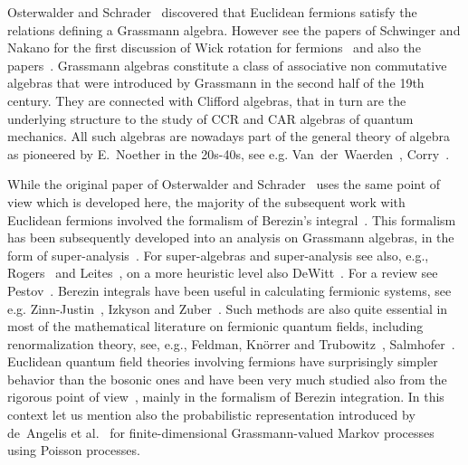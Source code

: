 \documentclass{article}
\begin{document}
Osterwalder and
Schrader~{\cite{osterwalder_euclidean_1973,osterwalder_euclidean_1973-2}}
discovered that Euclidean fermions satisfy the relations defining a Grassmann
algebra. However see the papers of Schwinger and Nakano for the first
discussion of Wick rotation for
fermions~{\cite{schwinger_euclidean_1958,schwinger_euclidean_1959}} and also
the
papers~{\cite{van_nieuwenhuizen_euclidean_1996,williams_euclidean_1974,MR0452281,lehmann_probabilistic_1991,borasi}}.
Grassmann algebras constitute a class of associative non commutative algebras
that were introduced by Grassmann in the second half of the 19th century. They
are connected with Clifford algebras, that in turn are the underlying
structure to the study of CCR and CAR algebras of quantum mechanics. All such
algebras are nowadays part of the general theory of algebra as pioneered by
E.~Noether in the 20s-40s, see e.g.
Van~der~Waerden~{\cite{van2003algebra1,van2003algebra2}},
Corry~{\cite{corry_modern_2004}}.

While the original paper of Osterwalder and
Schrader~{\cite{osterwalder_euclidean_1973-2}} uses the same point of view
which is developed here, the majority of the subsequent work with Euclidean
fermions involved the formalism of Berezin's integral~{\cite{Berezin2}}. This
formalism has been subsequently developed into an analysis on Grassmann
algebras, in the form of super-analysis~{\cite{Berezin2}}. For super-algebras
and super-analysis see also, e.g., Rogers~{\cite{Rogers2007}} and
Leites~{\cite{Leites}}, on a more heuristic level also DeWitt~{\cite{DeWitt}}.
For a review see Pestov~{\cite{pestov_analysis_1994}}. Berezin integrals have
been useful in calculating fermionic systems, see e.g.
Zinn-Justin~{\cite{ZinnJustin}}, Izkyson and Zuber~{\cite{Itzykson}}. Such
methods are also quite essential in most of the mathematical literature on
fermionic quantum fields, including renormalization theory, see, e.g.,
Feldman, Kn{\"o}rrer and Trubowitz~{\cite{MR1905424}},
Salmhofer~{\cite{salmhofer_renormalization}}. Euclidean quantum field theories
involving fermions have surprisingly simpler behavior than the bosonic ones
and have been very much studied also from the rigorous point of
view~{\cite{gawedzki_gross_neveu_1985,feldman_renormalizable_1986,lesniewski_effective_1987,rivasseau_perturbative_1991,disertori_continuous_1998,benfatto_functional_2007,mastropietro_non-perturbative_2008}},
mainly in the formalism of Berezin integration. In this context let us mention
also the probabilistic representation introduced by de~Angelis et
al.~{\cite{angelis_berezin_1998}} for finite-dimensional Grassmann-valued
Markov processes using Poisson processes.
\end{document}
